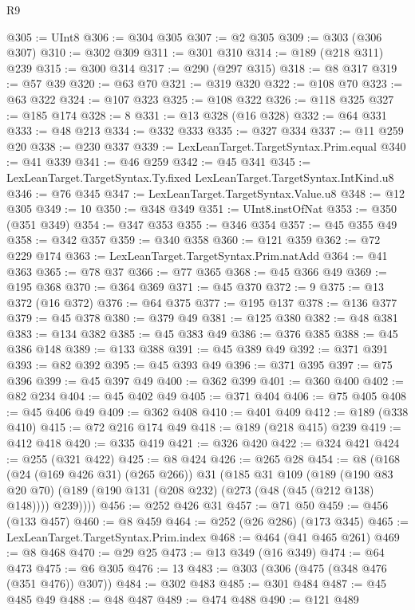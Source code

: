 \begin{lexlean}{R9}
\begin{coremodule}
@305 := UInt8
@306 := @304 @305
@307 := @2 @305
@309 := @303 (@306 @307)
@310 := @302 @309
@311 := @301 @310
@314 := @189 (@218 @311) @239
@315 := @300 @314
@317 := @290 (@297 @315)
@318 := @8 @317
@319 := @57 @39
@320 := @63 @70
@321 := @319 @320
@322 := @108 @70
@323 := @63 @322
@324 := @107 @323
@325 := @108 @322
@326 := @118 @325
@327 := @185 @174
@328 := 8
@331 := @13 @328 (@16 @328)
@332 := @64 @331
@333 := @48 @213
@334 := @332 @333
@335 := @327 @334
@337 := @11 @259 @20
@338 := @230 @337
@339 := LexLeanTarget.TargetSyntax.Prim.equal
@340 := @41 @339
@341 := @46 @259
@342 := @45 @341
@345 := LexLeanTarget.TargetSyntax.Ty.fixed LexLeanTarget.TargetSyntax.IntKind.u8
@346 := @76 @345
@347 := LexLeanTarget.TargetSyntax.Value.u8
@348 := @12 @305
@349 := 10
@350 := @348 @349
@351 := UInt8.instOfNat
@353 := @350 (@351 @349)
@354 := @347 @353
@355 := @346 @354
@357 := @45 @355 @49
@358 := @342 @357
@359 := @340 @358
@360 := @121 @359
@362 := @72 @229 @174
@363 := LexLeanTarget.TargetSyntax.Prim.natAdd
@364 := @41 @363
@365 := @78 @37
@366 := @77 @365
@368 := @45 @366 @49
@369 := @195 @368
@370 := @364 @369
@371 := @45 @370
@372 := 9
@375 := @13 @372 (@16 @372)
@376 := @64 @375
@377 := @195 @137
@378 := @136 @377
@379 := @45 @378
@380 := @379 @49
@381 := @125 @380
@382 := @48 @381
@383 := @134 @382
@385 := @45 @383 @49
@386 := @376 @385
@388 := @45 @386 @148
@389 := @133 @388
@391 := @45 @389 @49
@392 := @371 @391
@393 := @82 @392
@395 := @45 @393 @49
@396 := @371 @395
@397 := @75 @396
@399 := @45 @397 @49
@400 := @362 @399
@401 := @360 @400
@402 := @82 @234
@404 := @45 @402 @49
@405 := @371 @404
@406 := @75 @405
@408 := @45 @406 @49
@409 := @362 @408
@410 := @401 @409
@412 := @189 (@338 @410)
@415 := @72 @216 @174 @49
@418 := @189 (@218 @415) @239
@419 := @412 @418
@420 := @335 @419
@421 := @326 @420
@422 := @324 @421
@424 := @255 (@321 @422)
@425 := @8 @424
@426 := @265 @28
@454 := @8
    (@168
      (@24 (@169 @426 @31) (@265 @266))
      @31
      (@185
        @31
        @109
        (@189
          (@190 @83 @20 @70)
          (@189 (@190 @131 (@208 @232) (@273 (@48 (@45 (@212 @138) @148)))) @239))))
@456 := @252 @426 @31
@457 := @71 @50
@459 := @456 (@133 @457)
@460 := @8 @459
@464 := @252 (@26 @286) (@173 @345)
@465 := LexLeanTarget.TargetSyntax.Prim.index
@468 := @464 (@41 @465 @261)
@469 := @8 @468
@470 := @29 @25
@473 := @13 @349 (@16 @349)
@474 := @64 @473
@475 := @6 @305
@476 := 13
@483 := @303 (@306 (@475 (@348 @476 (@351 @476)) @307))
@484 := @302 @483
@485 := @301 @484
@487 := @45 @485 @49
@488 := @48 @487
@489 := @474 @488
@490 := @121 @489

\end{coremodule}
\end{lexlean}
